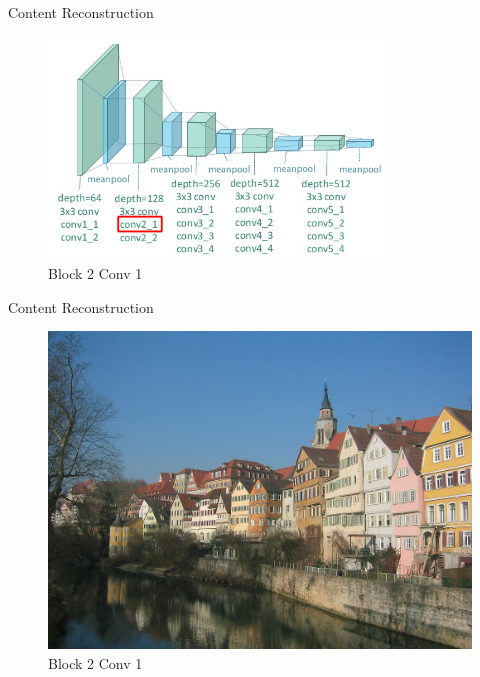 \documentclass{beamer}
\begin{document}
\begin{frame}{Content Reconstruction}
\begin{figure}[ht]
\centering
\includegraphics[width=0.8\textwidth]{img/vgg19/content/block2_conv1}
\caption*{Block 2 Conv 1}
\end{figure}
\end{frame}
\begin{frame}{Content Reconstruction}
\begin{figure}[ht]
\centering
\includegraphics[width=.8\textwidth]{img/content/block2_conv1}
\caption*{Block 2 Conv 1}
\end{figure}
\end{frame}
\end{document}
